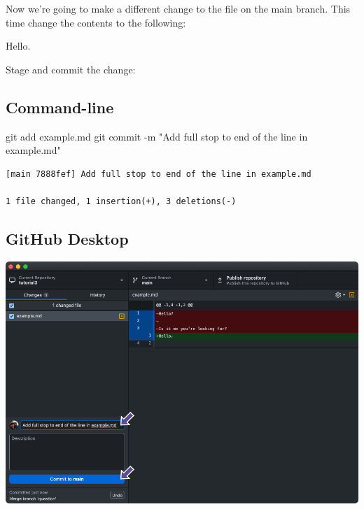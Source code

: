 \documentclass[
  letterpaper,
  DIV=11,
  numbers=noendperiod]{scrartcl}
\newenvironment{Shaded}{\begin{snugshade}}{\end{snugshade}}
\newcommand{\NormalTok}[1]{\textcolor[rgb]{0.00,0.23,0.31}{#1}}
\newcommand{\SpecialCharTok}[1]{\textcolor[rgb]{0.37,0.37,0.37}{#1}}
\newcommand{\StringTok}[1]{\textcolor[rgb]{0.13,0.47,0.30}{#1}}
\begin{document}
Now we're going to make a different change to the file on the main
branch. This time change the contents to the following:

\begin{tcolorbox}[enhanced jigsaw, opacityback=0, colframe=quarto-callout-note-color-frame, toprule=.15mm, arc=.35mm, rightrule=.15mm, title=\textcolor{quarto-callout-note-color}{\faInfo}\hspace{0.5em}{example.md}, colbacktitle=quarto-callout-note-color!10!white, left=2mm, leftrule=.75mm, opacitybacktitle=0.6, toptitle=1mm, colback=white, bottomtitle=1mm, breakable, titlerule=0mm, bottomrule=.15mm, coltitle=black]

Hello.

\end{tcolorbox}

Stage and commit the change:

\subsection{Command-line}

\begin{Shaded}
\begin{Highlighting}[]
\NormalTok{git add example.md}
\NormalTok{git commit }\SpecialCharTok{{-}}\NormalTok{m }\StringTok{"Add full stop to end of the line in example.md"}
\end{Highlighting}
\end{Shaded}

\begin{verbatim}
[main 7888fef] Add full stop to end of the line in example.md

1 file changed, 1 insertion(+), 3 deletions(-)
\end{verbatim}

\subsection{GitHub Desktop}

\includegraphics{images/image50.png}
\end{document}
